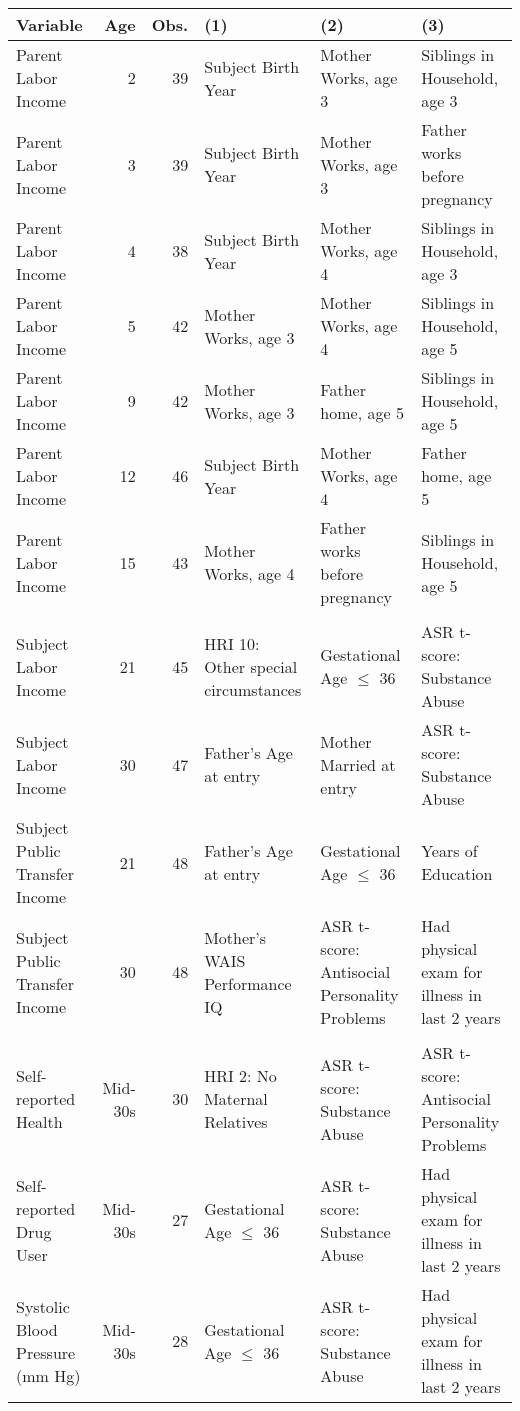 \tiny
\begin{tabular}{l r r l l l}
\hline\hline											
Variable	&	Age	&	Obs.	&	(1)	&	(2)	&	(3)	\\
\hline											
Parent Labor Income	&	2	&	39	&	Subject Birth Year	&	Mother Works, age 3	&	Siblings in Household, age 3	\\
Parent Labor Income	&	3	&	39	&	Subject Birth Year	&	Mother Works, age 3	&	Father works before pregnancy	\\
Parent Labor Income	&	4	&	38	&	Subject Birth Year	&	Mother Works, age 4	&	Siblings in Household, age 3	\\
Parent Labor Income	&	5	&	42	&	Mother Works, age 3	&	Mother Works, age 4	&	Siblings in Household, age 5	\\
Parent Labor Income	&	9	&	42	&	Mother Works, age 3	&	Father home, age 5	&	Siblings in Household, age 5	\\
Parent Labor Income	&	12	&	46	&	Subject Birth Year	&	Mother Works, age 4	&	Father home, age 5	\\
Parent Labor Income	&	15	&	43	&	Mother Works, age 4	&	Father works before pregnancy	&	Siblings in Household, age 5	\\
\\
Subject Labor Income	&	21	&	45	&	HRI 10: Other special circumstances	&	Gestational Age $\leq$ 36	&	ASR t-score: Substance Abuse	\\
Subject Labor Income	&	30	&	47	&	Father's Age at entry	&	Mother Married at entry	&	ASR t-score: Substance Abuse	\\
Subject Public Transfer Income	&	21	&	48	&	Father's Age at entry	&	Gestational Age $\leq$ 36	&	Years of Education	\\
Subject Public Transfer Income	&	30	&	48	&	Mother's WAIS Performance IQ	&	ASR t-score: Antisocial Personality Problems	&	Had physical exam for illness in last 2 years	\\
\\
Self-reported Health	&	Mid-30s	&	30	&	HRI 2: No Maternal Relatives	&	ASR t-score: Substance Abuse	&	ASR t-score: Antisocial Personality Problems	\\
Self-reported Drug User	&	Mid-30s	&	27	&	Gestational Age $\leq$ 36	&	ASR t-score: Substance Abuse	&	Had physical exam for illness in last 2 years	\\
Systolic Blood Pressure (mm Hg)	&	Mid-30s	&	28	&	Gestational Age $\leq$ 36	&	ASR t-score: Substance Abuse	&	Had physical exam for illness in last 2 years	\\

\end{tabular}
